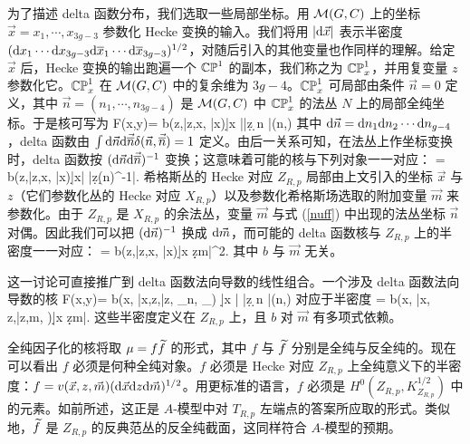 为了描述 delta 函数分布，我们选取一些局部坐标。用 ${\mathcal M}(G,C)$ 上的坐标 $\vec x=x_1,\cdots, x_{3g-3}$ 参数化 Hecke 变换的输入。我们将用 $|{\mathrm d} \vec x|$ 表示半密度 $({\mathrm d} x_1 \cdots {\mathrm d} x_{3g-3} {\mathrm d} \overline x_1 \cdots {\mathrm d} \overline x_{3g-3})^{1/2}$，对随后引入的其他变量也作同样的理解。给定 $\vec x$ 后，Hecke 变换的输出跑遍一个 ${\mathbb{CP}}^1$ 的副本，我们称之为 ${\mathbb{CP}}^1_x$，并用复变量 $z$ 参数化它。${\mathbb{CP}}^1_x $ 在 ${\mathcal M}(G,C)$ 中的复余维为 $3g-4$。${\mathbb{CP}}^1_x$ 可局部由条件 $\vec n=0$ 定义，其中 $\vec n=(n_1,\cdots, n_{3g-4})$ 是 ${\mathcal M}(G,C)$ 中 ${\mathbb{CP}}^1_x$ 的法丛 $N$ 上的局部全纯坐标。于是核可写为
\be\label{nuff} 
F(x,y)= b(z,\bar z,x, \bar x)|\d\vec x ||\d z \d \vec n |\delta(\vec n,)
\ee
其中 ${\mathrm d} \vec n={\mathrm d} n_1 {\mathrm d} n_2\cdots {\mathrm d} n_{g-4}$，delta 函数由 $\int {\mathrm d} \vec n {\mathrm d} \vec{ \overline n}\delta(\vec n,\vec{\overline n})=1$ 定义。由后一关系可知，在法丛上作坐标变换时，delta 函数按 $({\mathrm d} \vec n {\mathrm d} \vec{\overline n})^{-1}$ 变换；这意味着可能的核与下列对象一一对应：
\be\label{luff} \mu = b(z,\bar z,x, \bar x)|\d\vec x| |\d z(\d \vec n)^{-1}|. \ee
希格斯丛的 Hecke 对应 $Z_{R,p}$ 局部由上文引入的坐标 $\vec x$ 与 $z$（它们参数化丛的 Hecke 对应 $X_{R,p}$）以及参数化希格斯场选取的附加变量 $\vec m$ 来参数化。由于 $Z_{R,p}$ 是 $X_{R,p}$ 的余法丛，变量 $\vec m$ 与式 (\ref{nuff}) 中出现的法丛坐标 $\vec n$ 对偶。因此我们可以把 $({\mathrm d}\vec n)^{-1}$ 换成 ${\mathrm d} \vec m$，而可能的 delta 函数核与 $Z_{R,p}$ 上的半密度一一对应：
\be\label{luff1} \mu = b(z,\bar z,x, \bar x)|\d\vec x \d z\d \vec m|^2. \ee
其中 $b$ 与 $\vec m$ 无关。

这一讨论可直接推广到 delta 函数法向导数的线性组合。一个涉及 delta 函数法向导数的核
\be\label{nuff2} 
F(x,y)= b(x, \bar x,z,\bar z, \partial_{\vec n}, \partial_{}) |\d\vec x | |\d z \d \vec n |\delta(\vec n,)
\ee
对应于半密度
\be\label{luff2} \mu = b(x, \bar x, z,\bar z,\vec m, )|\d\vec x \d z\d \vec m|. \ee
这些半密度定义在 $Z_{R,p}$ 上，且 $b$ 对 $\vec m$ 有多项式依赖。

全纯因子化的核将取 $\mu = f \widetilde f$ 的形式，其中 $f$ 与 $\widetilde f$ 分别是全纯与反全纯的。现在可以看出 $f$ 必须是何种全纯对象。$f$ 必须是 Hecke 对应 $Z_{R,p}$ 上全纯意义下的半密度：$f=v(\vec x, z,\vec m) ({\mathrm d} \vec x{\mathrm d} z{\mathrm d}\vec m)^{1/2}$。用更标准的语言，$f$ 必须是 $H^0(Z_{R,p}, K^{1/2}_{Z_{R,p}})$ 中的元素。如前所述，这正是 $A$-模型中对 $T_{R,p}$ 左端点的答案所应取的形式。类似地，$\widetilde f$ 是 $Z_{R,p}$ 的反典范丛的反全纯截面，这同样符合 $A$-模型的预期。


